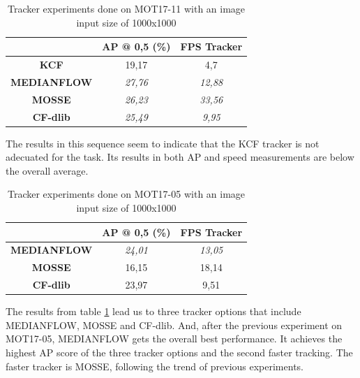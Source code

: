 \begin{table}[H]
\scriptsize
\begin{center}
\begin{tabular}{|c|c|c|}
\hline
\textbf{}           & \textbf{AP @ 0,5 (\%)} & \textbf{FPS Tracker} \\ \hline
\textbf{KCF}        & 19,17                  & 4,7                  \\ \hline
\textbf{MEDIANFLOW} & \textit{27,76}         & \textit{12,88}       \\ \hline
\textbf{MOSSE}      & \textit{26,23}         & \textit{33,56}       \\ \hline
\textbf{CF-dlib}    & \textit{25,49}         & \textit{9,95}        \\ \hline
\end{tabular}
\end{center}
\caption{Tracker experiments done on MOT17-11 with an image input size of 1000x1000}
\label{tab:tracker_exp_2}
\end{table}
The results in this sequence seem to indicate that the KCF tracker is not adecuated for the task. Its results in both AP and speed measurements are below the overall average.
\begin{table}[H]
\scriptsize
\begin{center}
\begin{tabular}{|c|c|c|}
\hline
\textbf{}           & \textbf{AP @ 0,5 (\%)} & \textbf{FPS Tracker} \\ \hline
\textbf{MEDIANFLOW} & \textit{24,01}         & \textit{13,05}       \\ \hline
\textbf{MOSSE}      & 16,15                  & 18,14               \\ \hline
\textbf{CF-dlib}    & 23,97                  & 9,51                 \\ \hline
\end{tabular}
\end{center}
\caption{Tracker experiments done on MOT17-05 with an image input size of 1000x1000}
\label{tab:tracker_exp_3}
\end{table}
The results from table \ref{tab:tracker_exp_2} lead us to three tracker options that include MEDIANFLOW, MOSSE and CF-dlib. And, after the previous experiment on MOT17-05, MEDIANFLOW gets the overall best performance. It achieves the highest AP score of the three tracker options and the second faster tracking. The faster tracker is MOSSE, following the trend of previous experiments.
